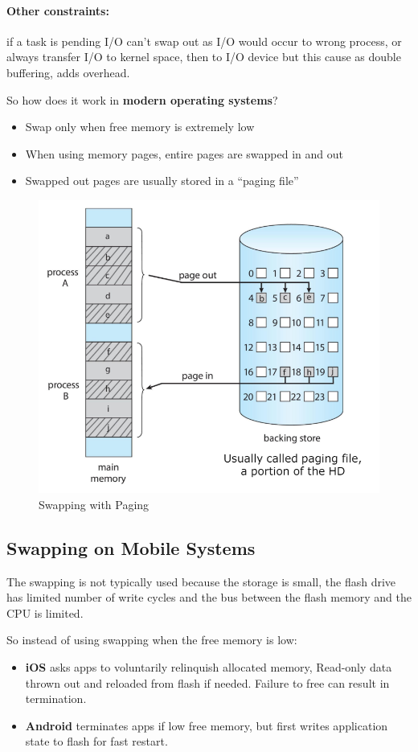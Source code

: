 \paragraph{Other constraints: } if a task is pending I/O can’t swap out as I/O would occur to wrong process, or always transfer I/O to kernel space, then to I/O device but this cause  as double buffering, adds overhead.


So how does it work in \textbf{modern operating systems}?


\begin{itemize}
    \item[] Swap only when free memory is extremely low
    \item[] When using memory pages, entire pages are swapped in and out
    \item[] Swapped out pages are usually stored in a “paging file”
\end{itemize}

\begin{figure}[h!]
    \centering
    \includegraphics[width=0.7\linewidth]{img/ndgf.png}
    \caption{Swapping with Paging}
\end{figure}

\newpage
\subsection{Swapping on Mobile Systems}

The swapping is not typically used because the storage is small, the flash drive has limited number of write cycles and the bus between the flash memory and the CPU is limited.

So instead of using swapping when the free memory is low:

\begin{itemize}
    \item \textbf{iOS} asks apps to voluntarily relinquish allocated memory, Read-only data thrown out and reloaded from flash if needed. Failure to free can result in termination.
    \item \textbf{Android} terminates apps if low free memory, but first writes application state to flash for fast restart.
\end{itemize}


